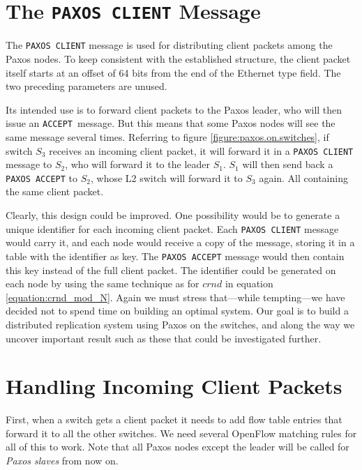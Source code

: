 \section{The \texttt{PAXOS CLIENT} Message}
\label{chapter:paxos.client.message}

The \texttt{PAXOS CLIENT} message is used for distributing client packets
among the Paxos nodes.
%
To keep consistent with the established structure, the client packet itself
starts at an offset of 64 bits from the end of the Ethernet type field.
%
The two preceding parameters are unused.

Its intended use is to forward client packets to the Paxos leader, who will
then issue an \texttt{ACCEPT} message.
%
But this means that some Paxos nodes will see the same message several
times.  Referring to figure \vref{figure:paxos.on.switches}, if switch $S_3$
receives an incoming client packet, it will forward it in a \texttt{PAXOS
CLIENT} message to $S_2$, who will forward it to the leader $S_1$.
$S_1$ will then send back a \texttt{PAXOS ACCEPT} to $S_2$, whose L2 switch
will forward it to $S_3$ again.  All containing the same client packet.

Clearly, this design could be improved.
%
One possibility would be to generate a unique identifier for each incoming
client packet.  Each \texttt{PAXOS CLIENT} message would carry it, and each
node would receive a copy of the message, storing it in a table with the
identifier as key.
%
The \texttt{PAXOS ACCEPT} message would then contain this key instead of the
full client packet.
%
The identifier could be generated on each node by using the same
technique as for $crnd$ in equation \vref{equation:crnd_mod_N}.
%
Again we must stress that---while tempting---we have decided not to spend
time on building an optimal system.
%
Our goal is to build a distributed replication system using Paxos on the
switches, and along the way we uncover important result such as these that
could be investigated further.

\section{Handling Incoming Client Packets}
\label{chapter:incoming.client}

First, when a switch gets a client packet it needs to add flow table
entries that forward it to all the other switches.
We need several OpenFlow matching rules for all of this to work.
%
Note that all Paxos nodes except the leader will be called for
\textit{Paxos slaves} from now on.

